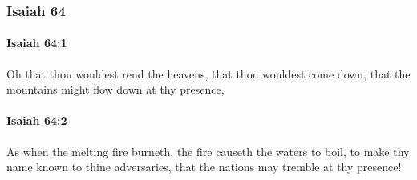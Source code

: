 	\subsubsection{Isaiah 64} %
		\label{ISAIAH-64}

		\paragraph{Isaiah 64:1} %
			\label{ISAIAH-64-1}

			Oh that thou wouldest rend the heavens, that thou wouldest come down, that the mountains might flow down at thy presence,


		\paragraph{Isaiah 64:2} %
			\label{ISAIAH-64-2}

			As when the melting fire burneth, the fire causeth the waters to boil, to make thy name known to thine adversaries, that the nations may tremble at thy presence!

